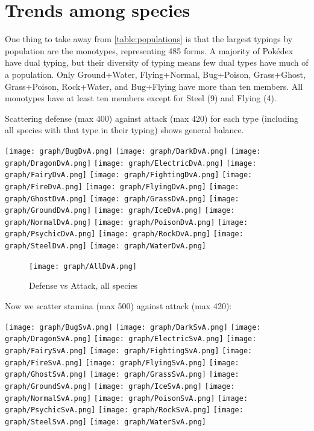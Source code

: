 \section{Trends among species}
One thing to take away from \autoref{table:populations} is that the largest
  typings by population are the monotypes, representing 485 forms.
A majority of Pokédex have dual typing, but their diversity of typing means few dual types have much of a population.
Only Ground+Water, Flying+Normal, Bug+Poison, Grass+Ghost, Grass+Poison, Rock+Water, and Bug+Flying
  have more than ten members.
All monotypes have at least ten members except for Steel (9) and Flying (4).

Scattering defense (max 400) against attack (max 420) for each type
  (including all species with that type in their typing) shows general
  balance.

\noindent{}\texttt{[image: graph/BugDvA.png]}
\texttt{[image: graph/DarkDvA.png]}
\texttt{[image: graph/DragonDvA.png]}
\texttt{[image: graph/ElectricDvA.png]}
\texttt{[image: graph/FairyDvA.png]}
\texttt{[image: graph/FightingDvA.png]}
\texttt{[image: graph/FireDvA.png]}
\texttt{[image: graph/FlyingDvA.png]}
\texttt{[image: graph/GhostDvA.png]}
\texttt{[image: graph/GrassDvA.png]}
\texttt{[image: graph/GroundDvA.png]}
\texttt{[image: graph/IceDvA.png]}
\texttt{[image: graph/NormalDvA.png]}
\texttt{[image: graph/PoisonDvA.png]}
\texttt{[image: graph/PsychicDvA.png]}
\texttt{[image: graph/RockDvA.png]}
\texttt{[image: graph/SteelDvA.png]}
\texttt{[image: graph/WaterDvA.png]}
\begin{figure}[h]
\centering
\texttt{[image: graph/AllDvA.png]}
  \caption{Defense vs Attack, all species\label{figure:alldva}}
\end{figure}

Now we scatter stamina (max 500) against attack (max 420):

\noindent{}\texttt{[image: graph/BugSvA.png]}
\texttt{[image: graph/DarkSvA.png]}
\texttt{[image: graph/DragonSvA.png]}
\texttt{[image: graph/ElectricSvA.png]}
\texttt{[image: graph/FairySvA.png]}
\texttt{[image: graph/FightingSvA.png]}
\texttt{[image: graph/FireSvA.png]}
\texttt{[image: graph/FlyingSvA.png]}
\texttt{[image: graph/GhostSvA.png]}
\texttt{[image: graph/GrassSvA.png]}
\texttt{[image: graph/GroundSvA.png]}
\texttt{[image: graph/IceSvA.png]}
\texttt{[image: graph/NormalSvA.png]}
\texttt{[image: graph/PoisonSvA.png]}
\texttt{[image: graph/PsychicSvA.png]}
\texttt{[image: graph/RockSvA.png]}
\texttt{[image: graph/SteelSvA.png]}
\texttt{[image: graph/WaterSvA.png]}

